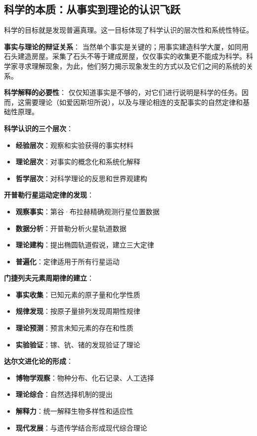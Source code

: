 \subsection{科学的本质：从事实到理论的认识飞跃}

\begin{theorembox}[title=科学认识的层次结构]
科学的目标就是发现普遍真理。这一目标体现了科学认识的层次性和系统性特征。

\textbf{事实与理论的辩证关系}：
当然单个事实是关键的；用事实建造科学大厦，如同用石头建造房屋。采集了石头不等于建成房屋，仅仅事实的收集更不能成为科学。科学家寻求理解现象，为此，他们努力揭示现象发生的方式以及它们之间的系统的关系。

\textbf{科学解释的必要性}：
仅仅知道事实是不够的，对它们进行说明是科学的任务。因而，这需要理论（如爱因斯坦所说），以及与理论相连的支配事实的自然定律和基础性原理。

\textbf{科学认识的三个层次}：
\begin{itemize}
\item \textbf{经验层次}：观察和实验获得的事实材料
\item \textbf{理论层次}：对事实的概念化和系统化解释
\item \textbf{哲学层次}：对科学理论的反思和世界观建构
\end{itemize}
\end{theorembox}

\begin{examplebox}[title=从事实到理论的科学发现过程]
\textbf{开普勒行星运动定律的发现}：
\begin{itemize}
\item \textbf{观察事实}：第谷·布拉赫精确观测行星位置数据
\item \textbf{数据分析}：开普勒分析火星轨道数据
\item \textbf{理论建构}：提出椭圆轨道假说，建立三大定律
\item \textbf{普遍化}：定律适用于所有行星运动
\end{itemize}

\textbf{门捷列夫元素周期律的建立}：
\begin{itemize}
\item \textbf{事实收集}：已知元素的原子量和化学性质
\item \textbf{规律发现}：按原子量排列发现周期性规律
\item \textbf{理论预测}：预言未知元素的存在和性质
\item \textbf{实验验证}：镓、钪、锗的发现验证了理论
\end{itemize}

\textbf{达尔文进化论的形成}：
\begin{itemize}
\item \textbf{博物学观察}：物种分布、化石记录、人工选择
\item \textbf{理论综合}：自然选择机制的提出
\item \textbf{解释力}：统一解释生物多样性和适应性
\item \textbf{现代发展}：与遗传学结合形成现代综合理论
\end{itemize}
\end{examplebox}

